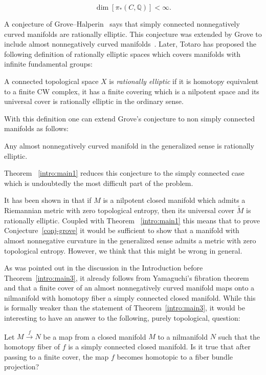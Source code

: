 \documentclass{amsart}
\begin{document}
\[
\dim [\pi_*(C,\mathbb{Q})]<\infty.
\]




A conjecture of Grove--Halperin~\cite{GH} says that simply connected nonnegatively curved manifolds are rationally elliptic. 
This conjecture was extended by Grove to include almost nonnegatively curved manifolds~\cite{Grv}.
Later, Totaro has proposed the following definition of  rationally elliptic spaces which covers manifolds with infinite fundamental groups:

A connected topological space $X$ is \emph{rationally elliptic}
if it is homotopy equivalent to a finite CW complex,
it has a finite covering which is a nilpotent space
and its universal cover is rationally elliptic in the ordinary sense.

With this definition one can extend Grove's conjecture  
to non simply connected manifolds as follows:

\begin{conj}\label{conj-grove}
Any almost nonnegatively curved manifold in the generalized sense is rationally elliptic.
\end{conj}

Theorem ~\ref{intro:main1}  reduces this conjecture to the simply connected case which is undoubtedly the most difficult part of the problem.



It has been shown in \cite{PaPe} that if $M$ is a nilpotent closed manifold which admits a Riemannian metric with zero topological entropy, then its universal cover $\tilde{M}$ is rationally elliptic.
Coupled with  Theorem ~\ref{intro:main1} this means that to prove Conjecture~\ref{conj-grove} it would be sufficient to show that a manifold with almost nonnegative curvature in
the
generalized sense admits a metric with zero topological entropy.
However, we think that this
 might be wrong in general.

\medskip

As was pointed out in the discussion in the Introduction before Theorem~\ref{intro:main3},  it already follows from Yamaguchi's fibration theorem
and \cite{FY}
that a finite cover of an almost nonnegatively curved manifold maps onto a nilmanifold
  with homotopy fiber a simply connected closed manifold.
While this is formally weaker than the statement of Theorem~\ref{intro:main3}, it would be interesting to
have an answer to the following, purely topological, question:


\begin{quest}
Let $ M \overset{f}{\longrightarrow} N$ be a map from a  closed manifold $M$
to  a nilmanifold $N$ such that  the homotopy fiber of $f$ is  a simply connected closed manifold.
Is it true that after passing to a finite cover, the map
$f$ becomes homotopic to a fiber bundle projection?
\end{quest}
\end{document}

